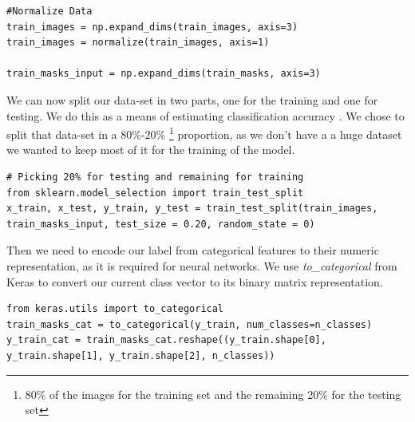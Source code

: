 \documentclass[12pt,a4paper]{scrartcl}
\begin{document}
\begin{lstlisting}[caption={Normalize the data, the code can be found in the \emph{train.py} file}]
#Normalize Data
train_images = np.expand_dims(train_images, axis=3)
train_images = normalize(train_images, axis=1)

train_masks_input = np.expand_dims(train_masks, axis=3)
\end{lstlisting}

We can now split our data-set in two parts, one for the training and one for testing. We do this as a means of estimating classification accuracy \cite{DatasetSplitting:2011}. We chose to split that data-set in a 80\%-20\% \footnote{80\% of the images for the training set and the remaining 20\% for the testing set} proportion, as we don't have a a huge dataset we wanted to keep most of it for the training of the model.
\begin{lstlisting}[caption={Dataset split for testing and training from the \emph{train.py} file}, label={lst:data-split}]
# Picking 20% for testing and remaining for training
from sklearn.model_selection import train_test_split
x_train, x_test, y_train, y_test = train_test_split(train_images, train_masks_input, test_size = 0.20, random_state = 0) 
\end{lstlisting}

Then we need to encode our label from categorical features to their numeric representation, as it is required for neural networks. We use \emph{to\_categorical} from Keras \cite{chollet2015keras} to convert our current class vector to its binary matrix representation.

\begin{lstlisting}[caption={Data conversion into categorical, code belongs in the \emph{train.py} file}, label={lst:data-categorical}]
from keras.utils import to_categorical
train_masks_cat = to_categorical(y_train, num_classes=n_classes)
y_train_cat = train_masks_cat.reshape((y_train.shape[0], y_train.shape[1], y_train.shape[2], n_classes))
\end{lstlisting}
\end{document}
